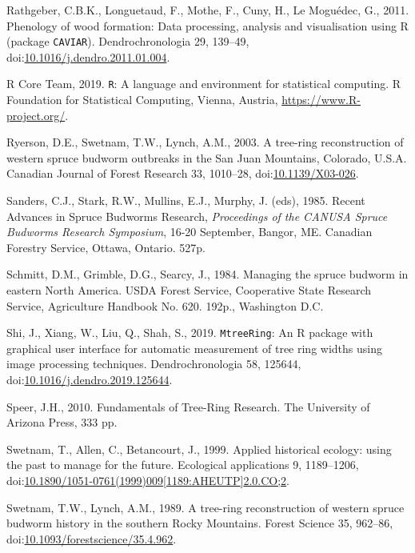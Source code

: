 \documentclass[review]{elsarticle} %
\begin{document}
\leavevmode\hypertarget{ref-Rathgeber2011}{}%
Rathgeber, C.B.K., Longuetaud, F., Mothe, F., Cuny, H., Le Moguédec, G., 2011. Phenology of wood formation: Data processing, analysis and visualisation using R (package \texttt{CAVIAR}). Dendrochronologia 29, 139--49, doi:\href{https://doi.org/10.1016/j.dendro.2011.01.004}{10.1016/j.dendro.2011.01.004}.

\leavevmode\hypertarget{ref-RCore}{}%
R Core Team, 2019. \texttt{R}: A language and environment for statistical computing. R Foundation for Statistical Computing, Vienna, Austria, \url{https://www.R-project.org/}.

\leavevmode\hypertarget{ref-Ryerson2003}{}%
Ryerson, D.E., Swetnam, T.W., Lynch, A.M., 2003. A tree-ring reconstruction of western spruce budworm outbreaks in the San Juan Mountains, Colorado, U.S.A. Canadian Journal of Forest Research 33, 1010--28, doi:\href{https://doi.org/10.1139/X03-026}{10.1139/X03-026}.

\leavevmode\hypertarget{ref-Sanders1985}{}%
Sanders, C.J., Stark, R.W., Mullins, E.J., Murphy, J. (eds), 1985. Recent Advances in Spruce Budworms Research, \emph{Proceedings of the CANUSA Spruce Budworms Research Symposium}, 16-20 September, Bangor, ME. Canadian Forestry Service, Ottawa, Ontario. 527p.

\leavevmode\hypertarget{ref-Schmitt1984}{}%
Schmitt, D.M., Grimble, D.G., Searcy, J., 1984. Managing the spruce budworm in eastern North America. USDA Forest Service, Cooperative State Research Service, Agriculture Handbook No. 620. 192p., Washington D.C.

\leavevmode\hypertarget{ref-Shi2019}{}%
Shi, J., Xiang, W., Liu, Q., Shah, S., 2019. \texttt{MtreeRing}: An R package with graphical user interface for automatic measurement of tree ring widths using image processing techniques. Dendrochronologia 58, 125644, doi:\href{https://doi.org/10.1016/j.dendro.2019.125644}{10.1016/j.dendro.2019.125644}.

\leavevmode\hypertarget{ref-Speer2010}{}%
Speer, J.H., 2010. Fundamentals of Tree-Ring Research. The University of Arizona Press, 333 pp.

\leavevmode\hypertarget{ref-Swetnam1999}{}%
Swetnam, T., Allen, C., Betancourt, J., 1999. Applied historical ecology: using the past to manage for the future. Ecological applications 9, 1189--1206, doi:\href{https://doi.org/10.1890/1051-0761(1999)009\%5B1189:AHEUTP\%5D2.0.CO;2}{10.1890/1051-0761(1999)009{[}1189:AHEUTP{]}2.0.CO;2}.

\leavevmode\hypertarget{ref-Swetnam1989}{}%
Swetnam, T.W., Lynch, A.M., 1989. A tree-ring reconstruction of western spruce budworm history in the southern Rocky Mountains. Forest Science 35, 962--86, doi:\href{https://doi.org/10.1093/forestscience/35.4.962}{10.1093/forestscience/35.4.962}.
\end{document}
